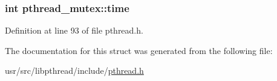 \hypertarget{structpthread__mutex_abd1e1875e0231a5dd6146adb8d6380c0}{
\subsubsection[{time}]{\setlength{\rightskip}{0pt plus 5cm}int pthread\+\_\+mutex\+::time}}\label{structpthread__mutex_abd1e1875e0231a5dd6146adb8d6380c0}


Definition at line 93 of file pthread.\+h.



The documentation for this struct was generated from the following file\+:\begin{DoxyCompactItemize}
\item 
usr/src/libpthread/include/\hyperlink{pthread_8h}{pthread.\+h}\end{DoxyCompactItemize}
